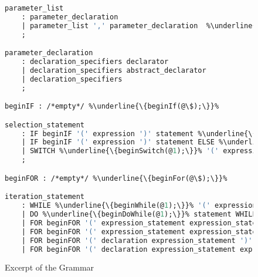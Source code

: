 \documentclass[12pt]{report}
\begin{document}
\begin{figure} 
\caption{Excerpt of the Grammar}
\label{grammar}
\begin{lstlisting}[language=Caml, escapechar=\%]
parameter_list
	: parameter_declaration											%\underline{\{h\_registerParameter(@\$);\}}%
	| parameter_list ',' parameter_declaration	%\underline{\{h\_registerParameter(@3);\}}%
	;

parameter_declaration
	: declaration_specifiers declarator
	| declaration_specifiers abstract_declarator
	| declaration_specifiers
	;

beginIF : /*empty*/ %\underline{\{beginIf(@\$);\}}%

selection_statement
	: IF beginIF '(' expression ')' statement %\underline{\{endIf(@\$);\}}%
	| IF beginIF '(' expression ')' statement ELSE %\underline{\{endIf(@6); beginElse(@7);\}}% statement	%\underline{\{endElse(@9);\}}%
	| SWITCH %\underline{\{beginSwitch(@1);\}}% '(' expression ')' statement %\underline{\{endSwitch(@\$);\}}%
	;

beginFOR : /*empty*/ %\underline{\{beginFor(@\$);\}}%

iteration_statement
	: WHILE %\underline{\{beginWhile(@1);\}}% '(' expression ')' statement %\underline{\{endWhile(@\$);\}}%
	| DO %\underline{\{beginDoWhile(@1);\}}% statement WHILE '(' expression ')' ';' %\underline{\{endDoWhile(@\$);\}}%
	| FOR beginFOR '(' expression_statement expression_statement ')' statement	%\underline{\{endFor(@\$);\}}%
	| FOR beginFOR '(' expression_statement expression_statement expression ')' statement %\underline{\{endFor(@\$);\}}%
	| FOR beginFOR '(' declaration expression_statement ')' statement %\underline{\{endFor(@\$);\}}%
	| FOR beginFOR '(' declaration expression_statement expression ')' statement	%\underline{\{endFor(@\$);\}}%

\end{lstlisting}
\end{figure} 
\end{document}
